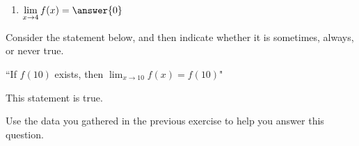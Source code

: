 \documentclass[handout]{ximera}
\begin{document}
\begin{exercise}
\begin{enumerate}

\item $\displaystyle\lim_{x\to 4} f(x) = \answer{0}$ 

\end{enumerate}

\end{exercise}

\begin{exercise}

Consider the statement below, and then indicate whether it is sometimes, always, or never true.

``If $f(10)$ exists, then $\displaystyle\lim_{x\to 10} f(x) = f(10)$"

This statement is  true.

\begin{hint}

Use the data you gathered in the previous exercise to help you answer this question.  

\end{hint}

\end{exercise}
\end{document}
